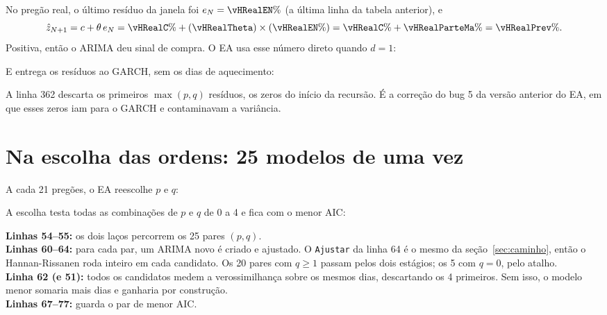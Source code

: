 \documentclass[11pt,a4paper]{article}
\newcommand{\cod}[1]{../../../tg/codigo/#1}
\newcommand{\trecho}[4]{}
\begin{document}
No pregão real, o último resíduo da janela foi $e_N = \vHRealEN\%$ (a última linha da tabela anterior), e
\[
  \hat z_{N+1} = c + \theta\, e_N = \vHRealC\% + (\vHRealTheta)\times(\vHRealEN\%) = \vHRealC\% + \vHRealParteMa\% = \vHRealPrev\%.
\]
Positiva, então o ARIMA deu sinal de compra. O EA usa esse número direto quando $d = 1$:

\trecho{\cod{ARIMA_GARCH_EA.mq5}}{143}{148}{tg/codigo/ARIMA\_GARCH\_EA.mq5}

E entrega os resíduos ao GARCH, sem os dias de aquecimento:

\trecho{\cod{ARIMA_GARCH_EA.mq5}}{150}{155}{tg/codigo/ARIMA\_GARCH\_EA.mq5}

\trecho{\cod{Arima.mqh}}{357}{371}{tg/codigo/Arima.mqh}

A linha 362 descarta os primeiros $\max(p,q)$ resíduos, os zeros do início da recursão. É a correção do bug 5 da versão
anterior do EA, em que esses zeros iam para o GARCH e contaminavam a variância.

\section{Na escolha das ordens: 25 modelos de uma vez}\label{sec:selecao}

A cada 21 pregões, o EA reescolhe $p$ e $q$:

\trecho{\cod{ARIMA_GARCH_EA.mq5}}{134}{141}{tg/codigo/ARIMA\_GARCH\_EA.mq5}

A escolha testa todas as combinações de $p$ e $q$ de 0 a 4 e fica com o menor AIC:

\trecho{\cod{SelecaoModelo.mqh}}{51}{78}{tg/codigo/SelecaoModelo.mqh (Apêndice B)}

\begin{leitura}
\textbf{Linhas 54--55:} os dois laços percorrem os 25 pares $(p,q)$.\\
\textbf{Linhas 60--64:} para cada par, um ARIMA novo é criado e ajustado. O \texttt{Ajustar} da linha 64 é o mesmo
da seção~\ref{sec:caminho}, então o Hannan-Rissanen roda inteiro em cada candidato. Os 20 pares com $q \ge 1$ passam
pelos dois estágios; os 5 com $q = 0$, pelo atalho.\\
\textbf{Linha 62 (e 51):} todos os candidatos medem a verossimilhança sobre os mesmos dias, descartando os 4
primeiros. Sem isso, o modelo menor somaria mais dias e ganharia por construção.\\
\textbf{Linhas 67--77:} guarda o par de menor AIC.
\end{leitura}
\end{document}
